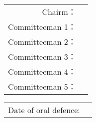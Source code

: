 \vskip 15pt

\begin{center}
    \begin{tabularx}{.7\textwidth}{r X<{\centering}}
        Chairm： & \uline{\hfill} \\
        Committeeman 1： &  \uline{\hfill} \\
        Committeeman 2： &  \uline{\hfill} \\
        Committeeman 3： &  \uline{\hfill} \\
        Committeeman 4： &  \uline{\hfill} \\
        Committeeman 5： &  \uline{\hfill} \\
    \end{tabularx}
\end{center}

\vskip 15pt

\begin{center}
    \begin{tabularx}{.6\textwidth}{l X<{\centering}}
        Date of oral defence: & \uline{\hfill}
    \end{tabularx}
\end{center}
